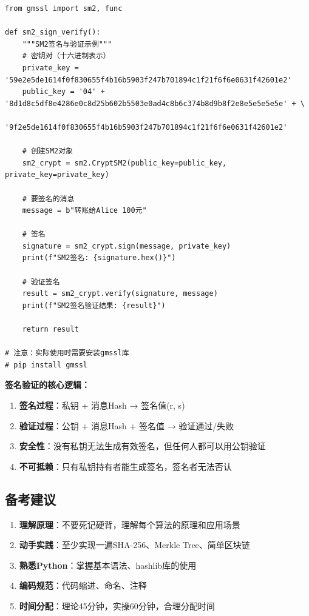 ﻿\documentclass[12pt,a4paper]{article}
\begin{document}
\begin{lstlisting}
from gmssl import sm2, func

def sm2_sign_verify():
    """SM2签名与验证示例"""
    # 密钥对（十六进制表示）
    private_key = '59e2e5de1614f0f830655f4b16b5903f247b701894c1f21f6f6e0631f42601e2'
    public_key = '04' + '8d1d8c5df8e4286e0c8d25b602b5503e0ad4c8b6c374b8d9b8f2e8e5e5e5e5e' + \
                 '9f2e5de1614f0f830655f4b16b5903f247b701894c1f21f6f6e0631f42601e2'
    
    # 创建SM2对象
    sm2_crypt = sm2.CryptSM2(public_key=public_key, private_key=private_key)
    
    # 要签名的消息
    message = b"转账给Alice 100元"
    
    # 签名
    signature = sm2_crypt.sign(message, private_key)
    print(f"SM2签名: {signature.hex()}")
    
    # 验证签名
    result = sm2_crypt.verify(signature, message)
    print(f"SM2签名验证结果: {result}")
    
    return result

# 注意：实际使用时需要安装gmssl库
# pip install gmssl
\end{lstlisting}

\begin{theorybox}
\textbf{签名验证的核心逻辑：}
\begin{enumerate}
\item \textbf{签名过程}：私钥 + 消息Hash → 签名值(r, s)
\item \textbf{验证过程}：公钥 + 消息Hash + 签名值 → 验证通过/失败
\item \textbf{安全性}：没有私钥无法生成有效签名，但任何人都可以用公钥验证
\item \textbf{不可抵赖}：只有私钥持有者能生成签名，签名者无法否认
\end{enumerate}
\end{theorybox}

\subsection{备考建议}

\begin{enumerate}[leftmargin=1.5em]
\item \textbf{理解原理}：不要死记硬背，理解每个算法的原理和应用场景
\item \textbf{动手实践}：至少实现一遍SHA-256、Merkle Tree、简单区块链
\item \textbf{熟悉Python}：掌握基本语法、hashlib库的使用
\item \textbf{编码规范}：代码缩进、命名、注释
\item \textbf{时间分配}：理论45分钟，实操60分钟，合理分配时间
\end{enumerate}
\end{document}
